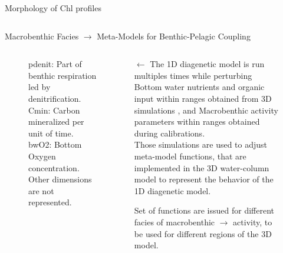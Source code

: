 \documentclass[final]{beamer}
\begin{document}
\begin{frame}[fragile]
\begin{columns}[T]
\begin{column}{.64\textwidth}
\begin{block}{Morphology of Chl profiles}
\begin{columns}[T]
	    \begin{column}{.32\textwidth}
	      
	    \end{column}	    
	  \end{columns}
	  	  \vskip -5mm
	\end{block}
	
	\begin{block}{ Macrobenthic Facies $\rightarrow$ Meta-Models for Benthic-Pelagic Coupling }
	  	  \vskip -12mm
	  \begin{columns}[T]
	    \begin{column}{.30\textwidth}
	      \begin{figure}
		\caption*{\footnotesize \alert{pdenit}: Part of benthic respiration led by denitrification. \alert{Cmin}: Carbon mineralized per unit of time. \alert{bwO2}: Bottom Oxygen concentration.
	      Other dimensions are not represented.}
	      \end{figure}
	    \end{column}
	    
	    \begin{column}{.40\textwidth}
	      \justify
	      \alert{\textbf{$\leftarrow$}} 
	      The \alert{1D diagenetic model} is run multiples times while perturbing \alert{Bottom water nutrients and organic input} within ranges obtained from 3D simulations
		, and \alert{Macrobenthic activity parameters} within ranges obtained during calibrations.\\	
	      Those simulations are used to adjust meta-model functions, that are implemented in the 3D water-column model to represent the behavior of the 1D diagenetic model. \\
	      \vspace{15mm}
	      
	      Set of functions are issued for different facies of macrobenthic  \alert{$\rightarrow$}  
	      activity, to be used for different regions of the 3D model.      
	    \end{column}


	    \begin{column}{.30\textwidth}
	      \begin{figure}
	      \end{figure}
	    \end{column}
	  \end{columns}
	  \vskip -5mm
	\end{block}
	

\end{column}
\end{columns}
\end{frame}
\end{document}
